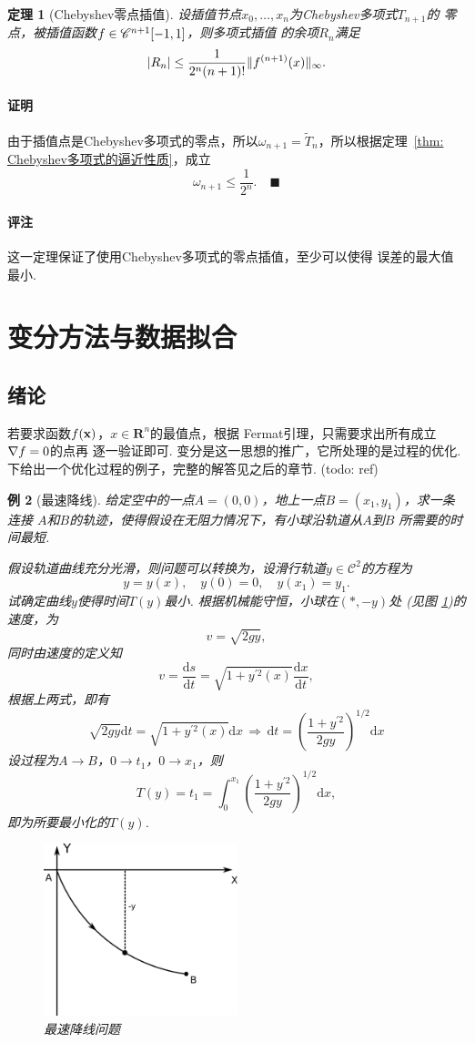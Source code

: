 \documentclass[12pt, a4paper]{article}
\theoremstyle{margin}
\newtheorem{thm}{定理}
\newtheorem{exa}[thm]{例}
\newcommand{\pr}{\prime}
\newcommand{\ms}{\mathscr}
\newcommand{\mbf}{\mathbf}
\newcommand{\f}{\mathnormal{f}}
\newcommand{\R}{\mathbf{R}}
\newcommand{\rd}{\mathrm{d}}
\newcommand\thmref[1]{定理~\ref{#1}}
\newcommand\figref[1]{图 \ref{#1}}
\newcommand{\remark}{\paragraph{评注}}
\newcommand{\proof}{\paragraph{证明}}
\begin{document}
  \begin{thm}[Chebyshev零点插值]
    设插值节点$x_0,\dots,x_n$为Chebyshev多项式$T_{n+1}$的
    零点，被插值函数$\f\in\ms{C}^{n+1}[-1, 1]$，则多项式插值
    的余项$R_n$满足
    \[
      |R_n| \le \frac{1}{2^n(n+1)!}\|\f^{(n+1)}(x)\|_{\infty}.
    \]
  \end{thm}
  \proof
    由于插值点是Chebyshev多项式的零点，所以$\omega_{n+1}=
    \widetilde{T}_n$，所以根据\thmref{thm: Chebyshev多项式的逼近性质}，成立
    \[
      \omega_{n+1} \le \frac{1}{2^n}.\quad\blacksquare
    \]
  \remark
    这一定理保证了使用Chebyshev多项式的零点插值，至少可以使得
    误差的最大值最小.

\newpage
\section{变分方法与数据拟合}
\subsection{绪论}
  若要求函数$\f(\mbf{x})$，$x\in\R^n$的最值点，根据
  Fermat引理，只需要求出所有成立$\nabla\f = 0$的点再
  逐一验证即可. 变分是这一思想的推广，它所处理的是过程的优化.
  下给出一个优化过程的例子，完整的解答见之后的章节. (todo: ref)

  \begin{exa}[最速降线]
    给定空中的一点$A=(0,0)$，地上一点$B=(x_1,y_1)$，求一条连接
    $A$和$B$的轨迹，使得假设在无阻力情况下，有小球沿轨道从$A$到$B$
    所需要的时间最短. \par
    假设轨道曲线充分光滑，则问题可以转换为，设滑行轨道$y\in\ms{C}^2$的方程为
    \[
      y=y(x), \quad y(0)=0,\quad y(x_1) = y_1.
    \]
    试确定曲线$y$使得时间$T(y)$最小. 根据机械能守恒，小球在$(*,-y)$处
    (见\figref{fig: 最速降线问题})的速度，为
    \[
      v = \sqrt{2gy},
    \]
    同时由速度的定义知
    \[
      v = \frac{\rd s}{\rd t} = \sqrt{1+y^{\pr2}(x)}\frac{\rd x}{\rd t},
    \]
    根据上两式，即有
    \[
      \sqrt{2gy}\rd t = \sqrt{1+y^{\pr2}(x)}\rd x \,\Rightarrow\,
      \rd t = \left( \frac{1+y^{\pr2}}{2gy} \right)^{1/2}\rd x
    \]
    设过程为$A\to B$，$0\to t_1$，$0\to x_1$，则
    \[
      T(y) = t_1 = \int_0^{x_1} \left( \frac{1+y^{\pr2}}{2gy} \right)^{1/2}\rd x,
    \]
    即为所要最小化的$T(y)$.
    \begin{figure}[htbp]
      \centering
      \includegraphics[height=5cm]{../image/brachistochrone.png}
      \caption{最速降线问题}
      \label{fig: 最速降线问题}
    \end{figure}
  \end{exa}
\end{document}
